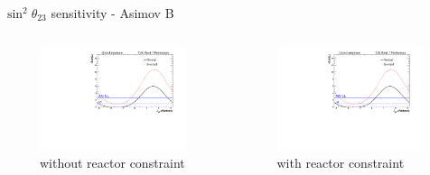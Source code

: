 \documentclass{beamer}
\newcommand{\sinsqthetatwothree}{$\sin^2\theta_{23}$\xspace}
\begin{document}
\begin{frame}{\sinsqthetatwothree sensitivity - Asimov B}
	\centering
	\begin{columns}
		\begin{column}{0.5\paperwidth}
			\begin{figure}
				\includegraphics[trim={0cm 0cm 0cm 0cm}, clip, scale=0.33] {images/sensitivity/th23_global_t2k}
				\caption*{without reactor constraint}
			\end{figure}
		\end{column}
		\begin{column}{0.5\paperwidth}
			\begin{figure}
				\includegraphics[trim={0cm 0cm 0cm 0cm}, clip, scale=0.33] {images/sensitivity/th23_global_t2k}
				\caption*{with reactor constraint}
			\end{figure}
		\end{column}
	\end{columns}
\end{frame}
\end{document}

